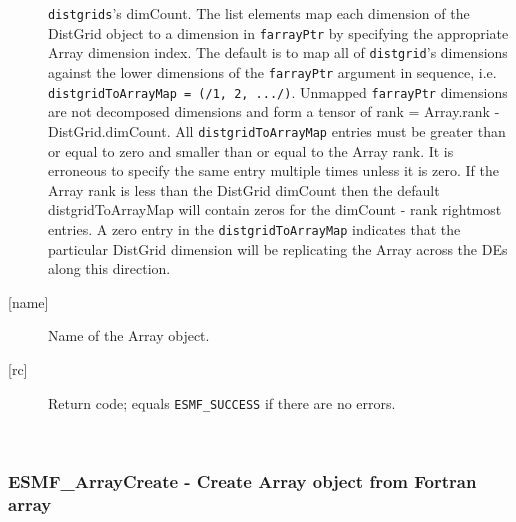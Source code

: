 \begin{description}
   {\tt distgrids}'s dimCount. The list elements map each dimension of 
   the DistGrid object to a dimension in {\tt farrayPtr} by specifying the 
   appropriate Array dimension index. The default is to map all of 
   {\tt distgrid}'s dimensions against the lower dimensions of the 
   {\tt farrayPtr} argument in sequence, i.e. {\tt distgridToArrayMap = 
   (/1, 2, .../)}. 
   Unmapped {\tt farrayPtr} dimensions are not decomposed dimensions and 
   form a tensor of rank = Array.rank - DistGrid.dimCount. 
   All {\tt distgridToArrayMap} entries must be greater than or equal 
   to zero and smaller than or equal to the Array rank. It is erroneous 
   to specify the same entry multiple times unless it is zero. 
   If the Array rank is less than the DistGrid dimCount then the default 
   distgridToArrayMap will contain zeros for the dimCount - rank 
   rightmost entries. A zero entry in the {\tt distgridToArrayMap} 
   indicates that the particular DistGrid dimension will be replicating 
   the Array across the DEs along this direction. 
   \item[{[name]}] 
   Name of the Array object. 
   \item[{[rc]}] 
   Return code; equals {\tt ESMF\_SUCCESS} if there are no errors. 
   \end{description} 
    
 
\mbox{}\hrulefill\ 
 
\subsubsection [ESMF\_ArrayCreate] {ESMF\_ArrayCreate - Create Array object from Fortran array }


